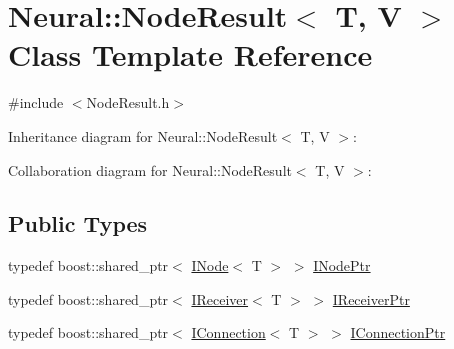 \hypertarget{class_neural_1_1_node_result}{
\section{Neural::NodeResult$<$ T, V $>$ Class Template Reference}
\label{class_neural_1_1_node_result}
}


{\ttfamily \#include $<$NodeResult.h$>$}



Inheritance diagram for Neural::NodeResult$<$ T, V $>$:


Collaboration diagram for Neural::NodeResult$<$ T, V $>$:
\subsection*{Public Types}
\begin{DoxyCompactItemize}
\item 
typedef boost::shared\_\-ptr$<$ \hyperlink{class_neural_1_1_i_node}{INode}$<$ T $>$ $>$ \hyperlink{class_neural_1_1_node_result_a709f0bb8f0b486a686967e5b3a2b7142}{INodePtr}
\item 
typedef boost::shared\_\-ptr$<$ \hyperlink{class_neural_1_1_i_receiver}{IReceiver}$<$ T $>$ $>$ \hyperlink{class_neural_1_1_node_result_aa3b43d495589b9b438ff84d41ac5b00d}{IReceiverPtr}
\item 
typedef boost::shared\_\-ptr$<$ \hyperlink{class_neural_1_1_i_connection}{IConnection}$<$ T $>$ $>$ \hyperlink{class_neural_1_1_node_result_adff4d0f9fa1cfcafd13113a00b7a3ff7}{IConnectionPtr}
\end{DoxyCompactItemize}
